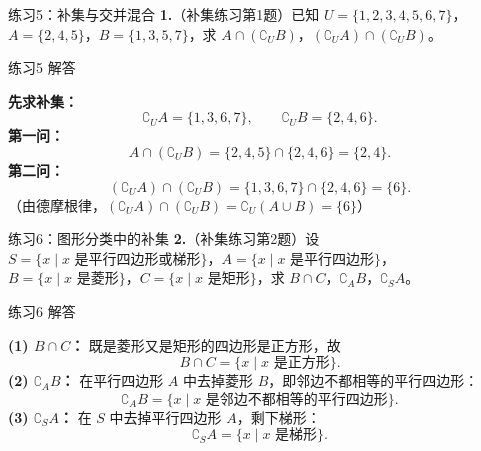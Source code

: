 \documentclass[10pt,aspectratio=169,serif]{beamer}
\begin{document}
\begin{frame}[t]{练习5：补集与交并混合}
\textbf{1.}（补集练习第1题）已知 $U = \{1, 2, 3, 4, 5, 6, 7\}$，$A = \{2, 4, 5\}$，$B = \{1, 3, 5, 7\}$，求 $A \cap (\complement_U B)$，$(\complement_U A) \cap (\complement_U B)$。
\end{frame}

\begin{frame}[t]{练习5 解答}
\begin{tcolorbox}[colback=orange!10,colframe=orange,title=\textbf{解}]
\textbf{先求补集：}
\[
\complement_U A = \{1, 3, 6, 7\},\qquad \complement_U B = \{2, 4, 6\}.
\]
\textbf{第一问：}
\[
A \cap (\complement_U B) = \{2, 4, 5\} \cap \{2, 4, 6\} = \{2, 4\}.
\]
\textbf{第二问：}
\[
(\complement_U A) \cap (\complement_U B) = \{1, 3, 6, 7\} \cap \{2, 4, 6\} = \{6\}.
\]
\vspace{0.5em}
\small（由德摩根律，$(\complement_U A)\cap(\complement_U B)=\complement_U(A\cup B)=\{6\}$）
\end{tcolorbox}
\end{frame}

\begin{frame}[t]{练习6：图形分类中的补集}
\textbf{2.}（补集练习第2题）设 $S = \{x \mid x \text{ 是平行四边形或梯形}\}$，$A = \{x \mid x \text{ 是平行四边形}\}$，$B = \{x \mid x \text{ 是菱形}\}$，$C = \{x \mid x \text{ 是矩形}\}$，求 $B \cap C$，$\complement_A B$，$\complement_S A$。
\end{frame}

\begin{frame}[t]{练习6 解答}
\begin{tcolorbox}[colback=orange!10,colframe=orange,title=\textbf{解}]
\textbf{(1) $B \cap C$：} 既是菱形又是矩形的四边形是正方形，故
\[
B \cap C = \{x \mid x \text{ 是正方形}\}.
\]
\textbf{(2) $\complement_A B$：} 在平行四边形 $A$ 中去掉菱形 $B$，即邻边不都相等的平行四边形：
\[
\complement_A B = \{x \mid x \text{ 是邻边不都相等的平行四边形}\}.
\]
\textbf{(3) $\complement_S A$：} 在 $S$ 中去掉平行四边形 $A$，剩下梯形：
\[
\complement_S A = \{x \mid x \text{ 是梯形}\}.
\]
\end{tcolorbox}
\end{frame}
\end{document}
